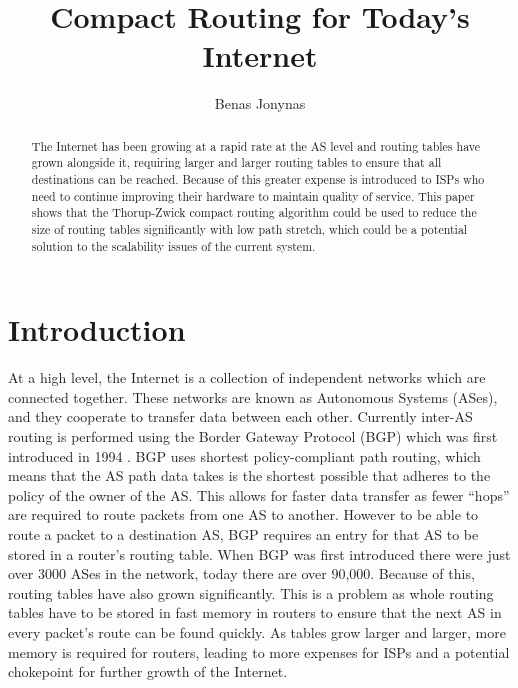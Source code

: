 \documentclass{dissertation/mpaper}
\begin{document}
\title{Compact Routing for Today's Internet}
\author{Benas Jonynas}

\maketitle

\begin{abstract}
    The Internet has been growing at a rapid rate at the AS level and routing tables have grown alongside it, requiring larger and larger routing tables to ensure that all destinations can be reached. Because of this greater expense is introduced to ISPs who need to continue improving their hardware to maintain quality of service. This paper shows that the Thorup-Zwick compact routing algorithm could be used to reduce the size of routing tables significantly with low path stretch, which could be a potential solution to the scalability issues of the current system.
\end{abstract}

\section{Introduction}

At a high level, the Internet is a collection of independent networks which are connected together. These networks are known as Autonomous Systems (ASes), and they cooperate to transfer data between each other. Currently inter-AS routing is performed using the Border Gateway Protocol (BGP) which was first introduced in 1994 \cite{rfc4271}. BGP uses shortest policy-compliant path routing, which means that the AS path data takes is the shortest possible that adheres to the policy of the owner of the AS. This allows for faster data transfer as fewer ``hops'' are required to route packets from one AS to another. However to be able to route a packet to a destination AS, BGP requires an entry for that AS to be stored in a router's routing table. When BGP was first introduced there were just over 3000 \cite{RIRStats} ASes in the network, today there are over 90,000. Because of this, routing tables have also grown significantly. This is a problem as whole routing tables have to be stored in fast memory in routers to ensure that the next AS in every packet's route can be found quickly. As tables grow larger and larger, more memory is required for routers, leading to more expenses for ISPs and a potential chokepoint for further growth of the Internet. 
\end{document}
